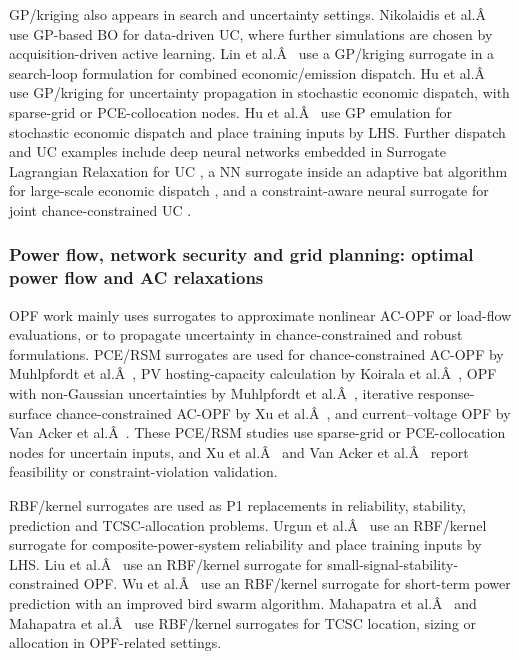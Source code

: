 GP/kriging also appears in search and uncertainty settings. Nikolaidis
et al.Â~\cite{Nikolaidis2021} use GP-based BO for data-driven UC, where
further simulations are chosen by acquisition-driven active learning.
Lin et al.Â~\cite{Lin2023} use a GP/kriging surrogate in a search-loop
formulation for combined economic/emission dispatch. Hu et
al.Â~\cite{Hu2021671} use GP/kriging for uncertainty propagation in
stochastic economic dispatch, with sparse-grid or PCE-collocation nodes.
Hu et al.Â~\cite{Hu2020} use GP emulation for stochastic economic dispatch
and place training inputs by LHS. Further dispatch and UC examples
include deep neural networks embedded in Surrogate Lagrangian
Relaxation for UC \cite{Wu2024391}, a NN surrogate inside an
adaptive bat algorithm for large-scale economic dispatch \cite{Pang2023},
and a constraint-aware neural surrogate for joint chance-constrained UC
\cite{Liang20246508}.

\subsubsection{Power flow, network security and grid planning: optimal power flow and AC relaxations}
\label{sec:apps:opf}

OPF work mainly uses surrogates to approximate nonlinear AC-OPF or
load-flow evaluations, or to propagate uncertainty in chance-constrained
and robust formulations. PCE/RSM surrogates are used for
chance-constrained AC-OPF by Muhlpfordt et al.Â~\cite{Muhlpfordt20194806}, PV
hosting-capacity calculation by Koirala et al.Â~\cite{Koirala20242284}, OPF
with non-Gaussian uncertainties by Muhlpfordt et
al.Â~\cite{Muhlpfordt20174490}, iterative response-surface chance-constrained
AC-OPF by Xu et al.Â~\cite{Xu20212696}, and current--voltage OPF by Van Acker
et al.Â~\cite{Van Acker2022}. These PCE/RSM studies use sparse-grid or
PCE-collocation nodes for uncertain inputs, and Xu et al.Â~\cite{Xu20212696}
and Van Acker et al.Â~\cite{Van Acker2022} report feasibility or
constraint-violation validation.

RBF/kernel surrogates are used as P1 replacements in reliability,
stability, prediction and TCSC-allocation problems. Urgun et
al.Â~\cite{Urgun20202791} use an RBF/kernel surrogate for
composite-power-system reliability and place training inputs by LHS. Liu
et al.Â~\cite{Liu20223726} use an RBF/kernel surrogate for
small-signal-stability-constrained OPF. Wu et al.Â~\cite{Wu2021__2} use an
RBF/kernel surrogate for short-term power prediction with an improved
bird swarm algorithm. Mahapatra et al.Â~\cite{Mahapatra20161921} and
Mahapatra et al.Â~\cite{Mahapatra2022721} use RBF/kernel surrogates for TCSC
location, sizing or allocation in OPF-related settings.

